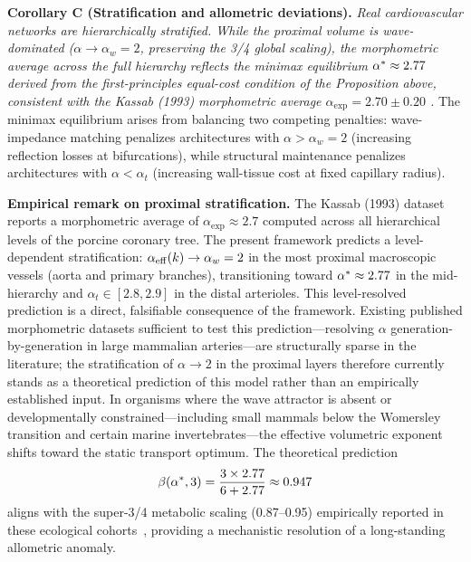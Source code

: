 \documentclass[11pt,a4paper]{article}
\theoremstyle{remark}
\begin{document}
\vspace{0.5em}
\noindent \textbf{Corollary C (Stratification and allometric deviations).} \textit{Real cardiovascular networks are hierarchically stratified. While the proximal volume is wave-dominated ($\alpha \to \alpha_w = 2$, preserving the 3/4 global scaling), the morphometric average across the full hierarchy reflects the minimax equilibrium $\alpha^* \approx 2.77{}$ derived from the first-principles equal-cost condition of the Proposition above, consistent with the Kassab (1993) morphometric average $\alpha_{\exp} = 2.70 \pm 0.20$ \cite{kassab1993}.} The minimax equilibrium arises from balancing two competing penalties: wave-impedance matching penalizes architectures with $\alpha > \alpha_w = 2$ (increasing reflection losses at bifurcations), while structural maintenance penalizes architectures with $\alpha < \alpha_t$ (increasing wall-tissue cost at fixed capillary radius).

\noindent\textbf{Empirical remark on proximal stratification.} The Kassab (1993) dataset reports a morphometric average of $\alpha_{\exp} \approx 2.7$ computed across all hierarchical levels of the porcine coronary tree. The present framework predicts a level-dependent stratification: $\alpha_{\rm eff}(k) \to \alpha_w = 2$ in the most proximal macroscopic vessels (aorta and primary branches), transitioning toward $\alpha^* \approx 2.77{}$ in the mid-hierarchy and $\alpha_t \in [2.8, 2.9]$ in the distal arterioles. This level-resolved prediction is a direct, falsifiable consequence of the framework. Existing published morphometric datasets sufficient to test this prediction---resolving $\alpha$ generation-by-generation in large mammalian arteries---are structurally sparse in the literature; the stratification of $\alpha \to 2$ in the proximal layers therefore currently stands as a theoretical prediction of this model rather than an empirically established input. In organisms where the wave attractor is absent or developmentally constrained---including small mammals below the Womersley transition and certain marine invertebrates---the effective volumetric exponent shifts toward the static transport optimum. The theoretical prediction
\begin{equation}
\beta(\alpha^*, 3) = \frac{3 \times 2.77}{6 + 2.77} \approx 0.947{}
\end{equation}
aligns with the super-3/4 metabolic scaling (0.87--0.95) empirically reported in
these ecological cohorts~\cite{glazier2005, white2013}, providing a mechanistic
resolution of a long-standing allometric anomaly.
\end{document}
